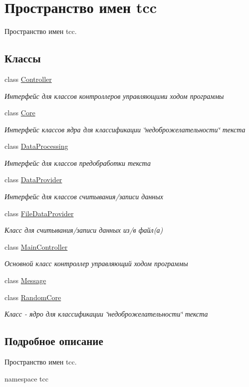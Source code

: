 \hypertarget{namespacetcc}{}\section{Пространство имен tcc}
\label{namespacetcc}


Пространство имен tcc.  


\subsection*{Классы}
\begin{DoxyCompactItemize}
\item 
class \mbox{\hyperlink{classtcc_1_1_controller}{Controller}}
\begin{DoxyCompactList}\small\item\em Интерфейс для классов контроллеров управляющими ходом программы \end{DoxyCompactList}\item 
class \mbox{\hyperlink{classtcc_1_1_core}{Core}}
\begin{DoxyCompactList}\small\item\em Интерфейс классов ядра для классификации \char`\"{}недоброжелательности\char`\"{} текста \end{DoxyCompactList}\item 
class \mbox{\hyperlink{classtcc_1_1_data_processing}{Data\+Processing}}
\begin{DoxyCompactList}\small\item\em Интерфейс для классов предобработки текста \end{DoxyCompactList}\item 
class \mbox{\hyperlink{classtcc_1_1_data_provider}{Data\+Provider}}
\begin{DoxyCompactList}\small\item\em Интерфейс для классов считывания/записи данных \end{DoxyCompactList}\item 
class \mbox{\hyperlink{classtcc_1_1_file_data_provider}{File\+Data\+Provider}}
\begin{DoxyCompactList}\small\item\em Класс для считывания/записи данных из/в файл(а) \end{DoxyCompactList}\item 
class \mbox{\hyperlink{classtcc_1_1_main_controller}{Main\+Controller}}
\begin{DoxyCompactList}\small\item\em Основной класс контроллер управляющий ходом программы \end{DoxyCompactList}\item 
class \mbox{\hyperlink{classtcc_1_1_message}{Message}}
\item 
class \mbox{\hyperlink{classtcc_1_1_random_core}{Random\+Core}}
\begin{DoxyCompactList}\small\item\em Класс -\/ ядро для классификации \char`\"{}недоброжелательности\char`\"{} текста \end{DoxyCompactList}\end{DoxyCompactItemize}


\subsection{Подробное описание}
Пространство имен tcc. 

namespace tcc 